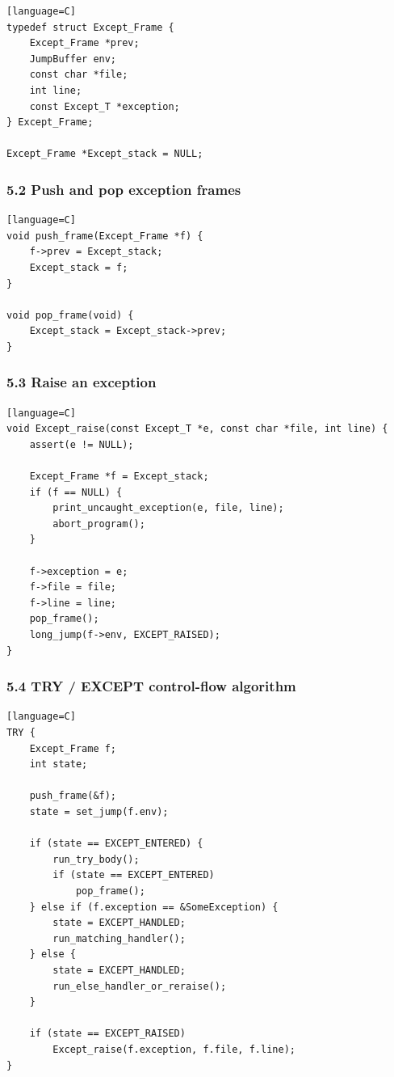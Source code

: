 \documentclass[11pt]{article}
\begin{document}
\begin{verbatim}[language=C]
typedef struct Except_Frame {
    Except_Frame *prev;
    JumpBuffer env;
    const char *file;
    int line;
    const Except_T *exception;
} Except_Frame;

Except_Frame *Except_stack = NULL;
\end{verbatim}

\subsubsection{5.2 Push and pop exception frames}\label{push-and-pop-exception-frames}

\begin{verbatim}[language=C]
void push_frame(Except_Frame *f) {
    f->prev = Except_stack;
    Except_stack = f;
}

void pop_frame(void) {
    Except_stack = Except_stack->prev;
}
\end{verbatim}

\subsubsection{5.3 Raise an exception}\label{raise-an-exception}

\begin{verbatim}[language=C]
void Except_raise(const Except_T *e, const char *file, int line) {
    assert(e != NULL);

    Except_Frame *f = Except_stack;
    if (f == NULL) {
        print_uncaught_exception(e, file, line);
        abort_program();
    }

    f->exception = e;
    f->file = file;
    f->line = line;
    pop_frame();
    long_jump(f->env, EXCEPT_RAISED);
}
\end{verbatim}

\subsubsection{5.4 TRY / EXCEPT control-flow algorithm}\label{try-except-control-flow-algorithm}

\begin{verbatim}[language=C]
TRY {
    Except_Frame f;
    int state;

    push_frame(&f);
    state = set_jump(f.env);

    if (state == EXCEPT_ENTERED) {
        run_try_body();
        if (state == EXCEPT_ENTERED)
            pop_frame();
    } else if (f.exception == &SomeException) {
        state = EXCEPT_HANDLED;
        run_matching_handler();
    } else {
        state = EXCEPT_HANDLED;
        run_else_handler_or_reraise();
    }

    if (state == EXCEPT_RAISED)
        Except_raise(f.exception, f.file, f.line);
}
\end{verbatim}
\end{document}
